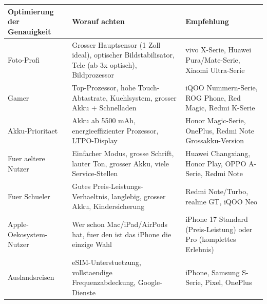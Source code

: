 \begin{center}
\begin{tabularx}{\linewidth}{|X|X|X|}
\hline
\textbf{Optimierung der Genauigkeit} & \textbf{Worauf achten} & \textbf{Empfehlung} \tabularnewline
\hline
Foto-Profi & Grosser Hauptsensor (1 Zoll ideal), optischer Bildstabilisator, Tele (ab 3x optisch), Bildprozessor & vivo X-Serie, Huawei Pura/Mate-Serie, Xiaomi Ultra-Serie \tabularnewline
Gamer & Top-Prozessor, hohe Touch-Abtastrate, Kuehlsystem, grosser Akku + Schnelladen & iQOO Nummern-Serie, ROG Phone, Red Magic, Redmi K-Serie \tabularnewline
Akku-Prioritaet & Akku ab 5500 mAh, energieeffizienter Prozessor, LTPO-Display & Honor Magic-Serie, OnePlus, Redmi Note Grossakku-Version \tabularnewline
Fuer aeltere Nutzer & Einfacher Modus, grosse Schrift, lauter Ton, grosser Akku, viele Service-Stellen & Huawei Changxiang, Honor Play, OPPO A-Serie, Redmi Note \tabularnewline
Fuer Schueler & Gutes Preis-Leistungs-Verhaeltnis, langlebig, grosser Akku, Kindersicherung & Redmi Note/Turbo, realme GT, iQOO Neo \tabularnewline
Apple-Oekosystem-Nutzer & Wer schon Mac/iPad/AirPods hat, fuer den ist das iPhone die einzige Wahl & iPhone 17 Standard (Preis-Leistung) oder Pro (komplettes Erlebnis) \tabularnewline
Auslandsreisen & eSIM-Unterstuetzung, vollstaendige Frequenzabdeckung, Google-Dienste & iPhone, Samsung S-Serie, Pixel, OnePlus \tabularnewline
\hline
\end{tabularx}
\end{center}


